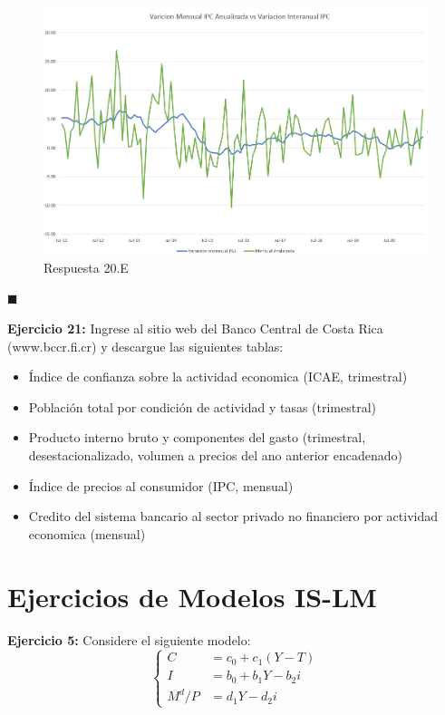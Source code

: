 \begin{enumerate}[(a)]
    \begin{figure}[h]
        \centering
        \includegraphics[scale = 0.5]{Images/VarMen_VarInt.png}
        \caption{Respuesta 20.E}
        \label{fig:cuadro 2}
    \end{figure}
    
$\blacksquare$
\end{enumerate}

\textbf{Ejercicio 21:} Ingrese al sitio web del Banco Central de Costa Rica (www.bccr.fi.cr) y descargue las siguientes tablas:
\begin{itemize}
    \item Índice de confianza sobre la actividad economica (ICAE, trimestral)
    \item Población total por condición de actividad y tasas (trimestral)
    \item Producto interno bruto y componentes del gasto (trimestral, desestacionalizado, volumen a precios del ano anterior encadenado)
    \item Índice de precios al consumidor (IPC, mensual)
    \item Credito del sistema bancario al sector privado no financiero por actividad economica (mensual)
\end{itemize}

\section{Ejercicios de Modelos IS-LM}
\textbf{Ejercicio 5:} Considere el siguiente modelo: 
\begin{equation}
  \begin{cases}
  C & =c_{0}+c_{1}(Y-T)\\
  I & = b_{0}+b_{1}Y -b_{2}i\\
  M^{d}/P & = d_{1}Y-d_{2}i
  \end{cases}  
\end{equation}

